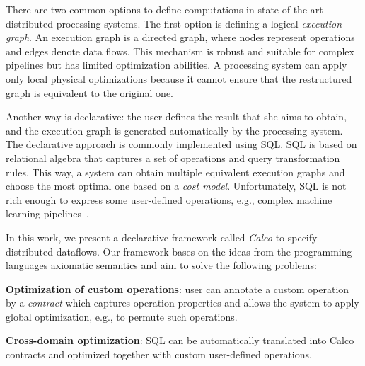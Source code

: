 There are two common options to define computations in state-of-the-art distributed processing systems.
The first option is defining a logical {\em execution graph}.
An execution graph is a directed graph, where nodes represent operations and edges denote data flows.
This mechanism is robust and suitable for complex pipelines but has limited optimization abilities. 
A processing system can apply only local physical optimizations because it cannot ensure that the restructured graph is equivalent to the original one.

Another way is declarative: the user defines the result that she aims to obtain, and the execution graph is generated automatically by the processing system.
The declarative approach is commonly implemented using SQL. 
SQL is based on relational algebra that captures a set of operations and query transformation rules.
This way, a system can obtain multiple equivalent execution graphs and choose the most optimal one based on a {\em cost model}. 
Unfortunately, SQL is not rich enough to express some user-defined operations, e.g., complex machine learning pipelines~\cite{PROOF}.

In this work, we present a declarative framework called {\em Calco} to specify distributed dataflows. Our framework bases on the ideas from the programming languages axiomatic semantics and aim to solve the following problems:

{\bf Optimization of custom operations}: user can annotate a custom operation by a {\em contract} which captures operation properties and allows the system to apply global optimization, e.g., to permute such operations.

{\bf Cross-domain optimization}: SQL can be automatically translated into Calco contracts and optimized together with custom user-defined operations.



